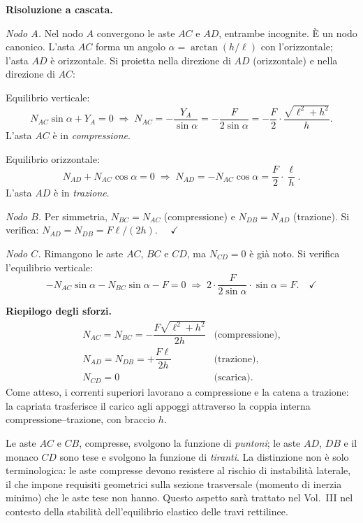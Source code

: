 \begin{esempio}
\begin{svolgimento}
		\noindent\textbf{Risoluzione a cascata.}
		
		\textit{Nodo $A$.}
		Nel nodo $A$ convergono le aste $AC$ e $AD$,
		entrambe incognite. È un nodo canonico.
		L'asta $AC$ forma un angolo $\alpha = \arctan(h/\ell)$
		con l'orizzontale; l'asta $AD$ è orizzontale.
		Si proietta nella direzione di $AD$ (orizzontale)
		e nella direzione di $AC$:
		
		Equilibrio verticale:
		\[
		N_{AC}\sin\alpha + Y_A = 0
		\;\Rightarrow\;
		N_{AC} = -\frac{Y_A}{\sin\alpha}
		= -\frac{F}{2\sin\alpha}
		= -\frac{F}{2} \cdot \frac{\sqrt{\ell^2+h^2}}{h}.
		\]
		L'asta $AC$ è in \emph{compressione}.
		
		Equilibrio orizzontale:
		\[
		N_{AD} + N_{AC}\cos\alpha = 0
		\;\Rightarrow\;
		N_{AD} = -N_{AC}\cos\alpha
		= \frac{F}{2} \cdot \frac{\ell}{h}.
		\]
		L'asta $AD$ è in \emph{trazione}.
		
		\textit{Nodo $B$.}
		Per simmetria, $N_{BC} = N_{AC}$ (compressione)
		e $N_{DB} = N_{AD}$ (trazione). Si verifica:
		$N_{AD} = N_{DB} = F\ell/(2h)$. $\quad\checkmark$
		
		\textit{Nodo $C$.}
		Rimangono le aste $AC$, $BC$ e $CD$, ma $N_{CD} = 0$
		è già noto. Si verifica l'equilibrio verticale:
		\[
		-N_{AC}\sin\alpha - N_{BC}\sin\alpha - F = 0
		\;\Rightarrow\;
		2 \cdot \frac{F}{2\sin\alpha} \cdot \sin\alpha
		= F. \quad\checkmark
		\]
		
		\noindent\textbf{Riepilogo degli sforzi.}
		\[
		\begin{array}{lll}
			N_{AC} = N_{BC} = -\dfrac{F\sqrt{\ell^2+h^2}}{2h}
			& \text{(compressione)}, \\[8pt]
			N_{AD} = N_{DB} = +\dfrac{F\ell}{2h}
			& \text{(trazione)}, \\[8pt]
			N_{CD} = 0
			& \text{(scarica)}.
		\end{array}
		\]
		Come atteso, i correnti superiori lavorano a
		compressione e la catena a trazione: la capriata
		trasferisce il carico agli appoggi attraverso
		la coppia interna compressione--trazione, con
		braccio $h$.
		\begin{oss}
			Le aste $AC$ e $CB$, compresse, svolgono la
			funzione di \emph{puntoni}; le aste $AD$, $DB$
			e il monaco $CD$ sono tese e svolgono la funzione
			di \emph{tiranti}. La distinzione non è solo
			terminologica: le aste compresse devono resistere
			al rischio di instabilità laterale, il che impone
			requisiti geometrici sulla sezione trasversale
			(momento di inerzia minimo) che le aste tese non
			hanno. Questo aspetto sarà trattato nel Vol.~III
			nel contesto della stabilità dell'equilibrio
			elastico delle travi rettilinee.
		\end{oss}
	\end{svolgimento}
\end{esempio}



